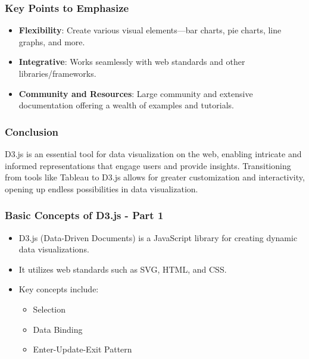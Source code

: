 \documentclass{beamer}
\begin{document}
\begin{frame}
    \frametitle{Key Points to Emphasize}
    \begin{itemize}
        \item \textbf{Flexibility}: Create various visual elements—bar charts, pie charts, line graphs, and more.
        \item \textbf{Integrative}: Works seamlessly with web standards and other libraries/frameworks.
        \item \textbf{Community and Resources}: Large community and extensive documentation offering a wealth of examples and tutorials.
    \end{itemize}
\end{frame}

\begin{frame}
    \frametitle{Conclusion}
    D3.js is an essential tool for data visualization on the web, enabling intricate and informed representations that engage users and provide insights. Transitioning from tools like Tableau to D3.js allows for greater customization and interactivity, opening up endless possibilities in data visualization.
\end{frame}

\begin{frame}[fragile]
    \frametitle{Basic Concepts of D3.js - Part 1}
    \begin{itemize}
        \item D3.js (Data-Driven Documents) is a JavaScript library for creating dynamic data visualizations.
        \item It utilizes web standards such as SVG, HTML, and CSS.
        \item Key concepts include:
        \begin{itemize}
            \item Selection
            \item Data Binding
            \item Enter-Update-Exit Pattern
        \end{itemize}
    \end{itemize}
\end{frame}
\end{document}

